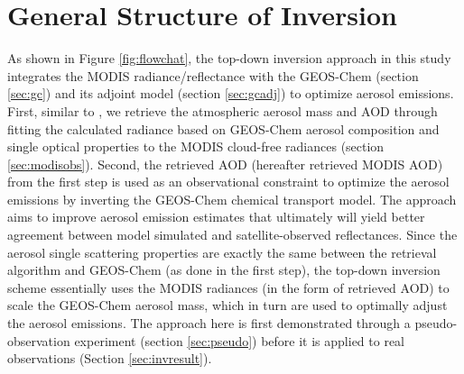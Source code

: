  \section{General Structure of Inversion} \label{sec:generalstr}

 As shown in Figure \ref{fig:flowchat}, the top-down inversion approach in this study 
 integrates the MODIS radiance/reflectance with the GEOS-Chem (section \ref{sec:gc}) 
 and its adjoint model (section \ref{sec:gcadj}) to optimize aerosol emissions. 
 First, similar to \citet{wang10}, we retrieve the atmospheric 
 aerosol mass and AOD through fitting the calculated radiance based on 
 GEOS-Chem aerosol composition and single optical properties to the MODIS 
 cloud-free radiances (section \ref{sec:modisobs}). Second, the retrieved AOD 
 (hereafter retrieved MODIS AOD) from the first step is used as 
 an observational constraint to optimize the aerosol emissions 
 by inverting the GEOS-Chem chemical transport model. 
 The approach aims to improve aerosol emission estimates that ultimately 
 will yield better agreement between model simulated and satellite-observed 
 reflectances.  Since the aerosol single scattering properties are 
 exactly the same between the retrieval algorithm and GEOS-Chem 
 (as done in the first step), the top-down inversion scheme essentially 
 uses the MODIS radiances (in the form of retrieved AOD) to scale the 
 GEOS-Chem aerosol mass, which in turn are used to optimally adjust 
 the aerosol emissions. The approach here is first demonstrated through 
 a pseudo-observation experiment (section \ref{sec:pseudo}) before it is applied 
 to real observations (Section \ref{sec:invresult}).

